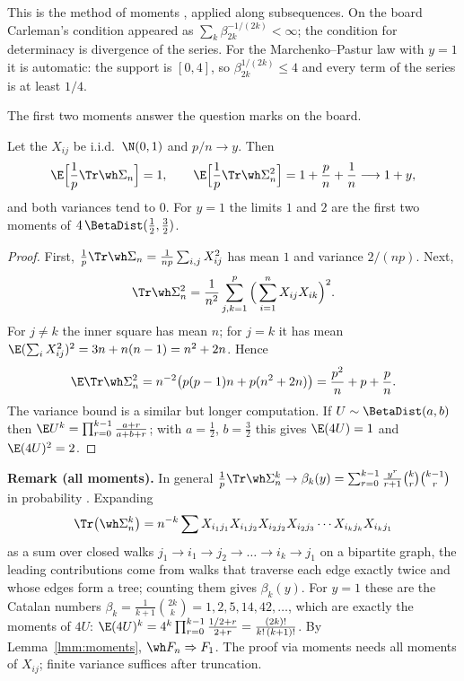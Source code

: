 This is the method of moments \citep[Thm.~30.2]{Bil95}, applied along subsequences. On the board Carleman's condition appeared as \(\sum_k \beta_{2k}^{-1/(2k)} < \infty\); the condition for determinacy is divergence of the series. For the Marchenko--Pastur law with \(y = 1\) it is automatic: the support is \([0, 4]\), so \(\beta_{2k}^{1/(2k)} \le 4\) and every term of the series is at least \(1/4\).

The first two moments answer the question marks on the board.

\begin{proposition}\label{prop:twomoments}
Let the \(X_{ij}\) be i.i.d.\ \(\N(0,1)\) and \(p/n \to y\). Then
\[\E\Big[\frac{1}{p} \Tr \wh\Sigma_n\Big] = 1, \qquad
\E\Big[\frac{1}{p} \Tr \wh\Sigma_n^2\Big] = 1 + \frac{p}{n} + \frac{1}{n} \longrightarrow 1 + y,\]
and both variances tend to \(0\). For \(y = 1\) the limits \(1\) and \(2\) are the first two moments of \(4\,\BetaDist(\tfrac12, \tfrac32)\).
\end{proposition}

\begin{proof}
First, \(\frac{1}{p} \Tr \wh\Sigma_n = \frac{1}{np} \sum_{i,j} X_{ij}^2\) has mean \(1\) and variance \(2/(np)\). Next,
\[\Tr \wh\Sigma_n^2 = \frac{1}{n^2} \sum_{j,k=1}^p \Big(\sum_{i=1}^n X_{ij} X_{ik}\Big)^2.\]
For \(j \ne k\) the inner square has mean \(n\); for \(j = k\) it has mean \(\E(\sum_i X_{ij}^2)^2 = 3n + n(n-1) = n^2 + 2n\). Hence
\[\E \Tr \wh\Sigma_n^2 = n^{-2}\big(p(p-1)n + p(n^2 + 2n)\big) = \frac{p^2}{n} + p + \frac{p}{n}.\]
The variance bound is a similar but longer computation. If \(U \sim \BetaDist(a, b)\) then \(\E U^k = \prod_{r=0}^{k-1} \frac{a+r}{a+b+r}\); with \(a = \frac12\), \(b = \frac32\) this gives \(\E(4U) = 1\) and \(\E(4U)^2 = 2\).
\end{proof}

\textbf{Remark (all moments).} In general \(\frac{1}{p} \Tr \wh\Sigma_n^k \to \beta_k(y) = \sum_{r=0}^{k-1} \frac{y^r}{r+1} \binom{k}{r} \binom{k-1}{r}\) in probability \citep[Sec.~3.1]{BS10}. Expanding
\[\Tr\big(\wh\Sigma_n^k\big) = n^{-k} \sum X_{i_1 j_1} X_{i_1 j_2} X_{i_2 j_2} X_{i_2 j_3} \cdots X_{i_k j_k} X_{i_k j_1}\]
as a sum over closed walks \(j_1 \to i_1 \to j_2 \to \dots \to i_k \to j_1\) on a bipartite graph, the leading contributions come from walks that traverse each edge exactly twice and whose edges form a tree; counting them gives \(\beta_k(y)\). For \(y = 1\) these are the Catalan numbers \(\beta_k = \frac{1}{k+1} \binom{2k}{k} = 1, 2, 5, 14, 42, \dots\), which are exactly the moments of \(4U\): \(\E(4U)^k = 4^k \prod_{r=0}^{k-1} \frac{1/2 + r}{2 + r} = \frac{(2k)!}{k!\,(k+1)!}\). By Lemma~\ref{lmm:moments}, \(\wh F_n \Rightarrow F_1\). The proof via moments needs all moments of \(X_{ij}\); finite variance suffices after truncation.

